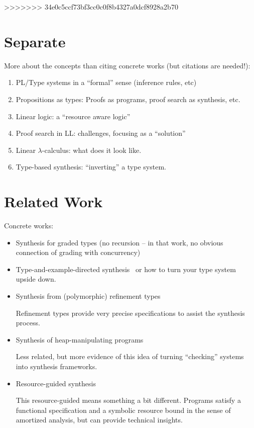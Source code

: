 \documentclass{llncs}
\begin{document}
>>>>>>> 34e0c5ccf73bf3cc0c0f8b4327a0dcf8928a2b70


\section{Separate}

More about the concepts than citing concrete works (but citations are
needed!):
\begin{enumerate}
\item PL/Type systems in a ``formal'' sense (inference rules, etc)
\item Propositions as types: Proofs as programs, proof search as
  synthesis, etc.
\item Linear logic: a ``resource aware logic''
\item Proof search in LL: challenges, focusing as a ``solution''
\item Linear $\lambda$-calculus: what does it look like.
\item Type-based synthesis: ``inverting'' a type system.
\end{enumerate}

\section{Related Work}

Concrete works:
\begin{itemize}
\item Synthesis for graded types (no recursion   -- in that work, no
  obvious connection of grading with
  concurrency)~\cite{DBLP:conf/lopstr/HughesO20}

\item Type-and-example-directed
  synthesis~\cite{DBLP:conf/pldi/OseraZ15,DBLP:conf/popl/FrankleOWZ16}
  or how to turn your type system upside down.
  
\item Synthesis from (polymorphic) refinement types~\cite{DBLP:conf/pldi/PolikarpovaKS16}

Refinement types provide very precise specifications to assist the
synthesis process.

\item Synthesis of heap-manipulating
  programs~\cite{DBLP:journals/pacmpl/PolikarpovaS19}

Less related, but more evidence of this idea of turning ``checking''
systems into synthesis frameworks.

\item Resource-guided synthesis \cite{DBLP:conf/pldi/KnothWP019}

This resource-guided means something a bit different. Programs satisfy
a functional specification and a symbolic resource bound in the sense
of amortized analysis, but can provide technical insights.

\end{itemize}
\end{document}
